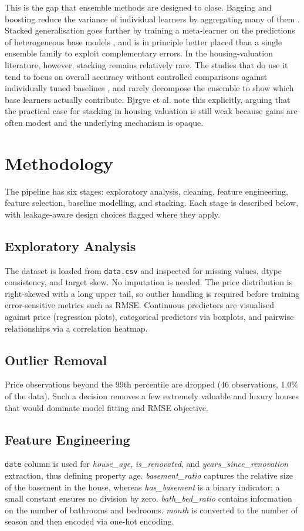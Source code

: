 \documentclass[conference]{IEEEtran}
\begin{document}
This is the gap that ensemble methods are designed to close. Bagging and boosting reduce the variance of individual learners by aggregating many of them \cite{10.1023/A:1010933404324,hjort2022house}. Stacked generalisation goes further by training a meta-learner on the predictions of heterogeneous base models \cite{WOLPERT1992241}, and is in principle better placed than a single ensemble family to exploit complementary errors. In the housing-valuation literature, however, stacking remains relatively rare. The studies that do use it tend to focus on overall accuracy without controlled comparisons against individually tuned baselines \cite{land13091436,10937620}, and rarely decompose the ensemble to show which base learners actually contribute. Bjrgve et al. \cite{Bjrgve2025ComparingHV} note this explicitly, arguing that the practical case for stacking in housing valuation is still weak because gains are often modest and the underlying mechanism is opaque.


\section{Methodology}
The pipeline has six stages: exploratory analysis, cleaning, feature engineering, feature selection, baseline modelling, and stacking. Each stage is described below, with leakage-aware design choices flagged where they apply.
\subsection{Exploratory Analysis}
The dataset is loaded from \texttt{data.csv} and inspected for missing values, dtype consistency, and target skew. No imputation is needed. The price distribution is right-skewed with a long upper tail, so outlier handling is required before training error-sensitive metrics such as RMSE. Continuous predictors are visualised against price (regression plots), categorical predictors via boxplots, and pairwise relationships via a correlation heatmap.

\subsection{Outlier Removal}
Price observations beyond the 99th percentile are dropped (46 observations, 1.0\% of the data). Such a decision removes a few extremely valuable and luxury houses that would dominate model fitting and RMSE objective.

\subsection{Feature Engineering}
\texttt{date} column is used for \textit{house\_age}, \textit{is\_renovated}, and \textit{years\_since\_renovation} extraction, thus defining property age. \textit{basement\_ratio} captures the relative size of the basement in the house, whereas \textit{has\_basement} is a binary indicator; a small constant ensures no division by zero. \textit{bath\_bed\_ratio} contains information on the number of bathrooms and bedrooms. \textit{month} is converted to the number of season and then encoded via one-hot encoding.
\end{document}
